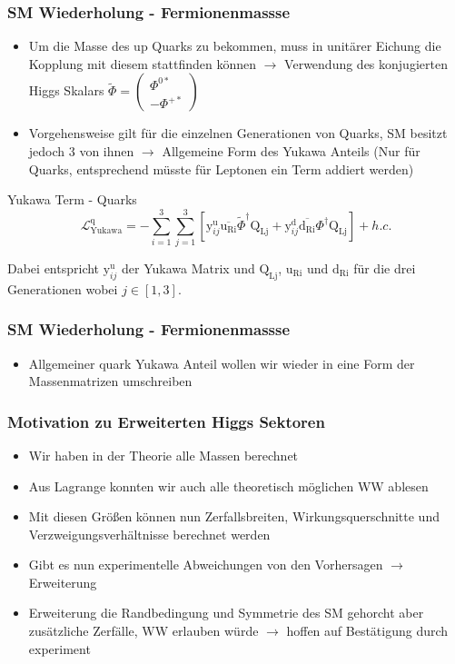 \documentclass{beamer}
\begin{document}
\begin{frame}[t]
\frametitle{SM Wiederholung - Fermionenmassse}
\begin{itemize}
\item Um die Masse des up Quarks zu bekommen, muss in unitärer Eichung die Kopplung mit diesem stattfinden können $\rightarrow$ Verwendung des konjugierten Higgs Skalars  $\tilde{\Phi}=\left( \begin{array}{c} \Phi^{0*}\\ -\Phi^{+*} \end{array}\right)$ 
\item Vorgehensweise gilt für die einzelnen Generationen von Quarks, SM besitzt jedoch 3 von ihnen $\rightarrow$ Allgemeine Form des Yukawa Anteils (Nur für Quarks, entsprechend müsste für Leptonen ein Term addiert werden)
\end{itemize}
\begin{block}{Yukawa Term - Quarks}
\begin{equation*}
\mathscr{L}_{\text{Yukawa}}^{\text{q}}=- \sum_{i=1}^{3} \sum_{j=1}^{3} [\text{y}^{\text{u}}_{ij}\overline{\text{u}_{\text{Ri}}} \tilde{\Phi}^{\dagger}\text{Q}_{\text{Lj}}+\text{y}^{\text{d}}_{ij} \overline{\text{d}_{\text{Ri}}}\Phi^{\dagger} \text{Q}_{\text{Lj}}]+h.c.
\end{equation*}
\end{block}
Dabei entspricht $\text{y}^{\text{u}}_{ij}$ der Yukawa Matrix und $\text{Q}_{\text{Lj}}$, $\text{u}_{\text{Ri}}$ und $\text{d}_{\text{Ri}}$ für die drei Generationen wobei $j \in [1,3]$.


\end{frame}

\begin{frame}[t]
\frametitle{SM Wiederholung - Fermionenmassse}
\begin{itemize}
\item Allgemeiner quark Yukawa Anteil wollen wir wieder in eine Form der Massenmatrizen umschreiben
\end{itemize}
\end{frame}

\begin{frame}
\frametitle{Motivation zu Erweiterten Higgs Sektoren}
\begin{itemize}
\item Wir haben in der Theorie alle Massen berechnet 
\item Aus Lagrange konnten wir auch alle theoretisch möglichen WW ablesen 
\item Mit diesen Größen können nun Zerfallsbreiten, Wirkungsquerschnitte und Verzweigungsverhältnisse berechnet werden
\item Gibt es nun experimentelle Abweichungen von den Vorhersagen $\rightarrow$ Erweiterung
\item Erweiterung die Randbedingung und Symmetrie des SM gehorcht aber zusätzliche Zerfälle, WW erlauben würde $\rightarrow$ hoffen auf Bestätigung durch experiment
\end{itemize}
\end{frame}
\end{document}
